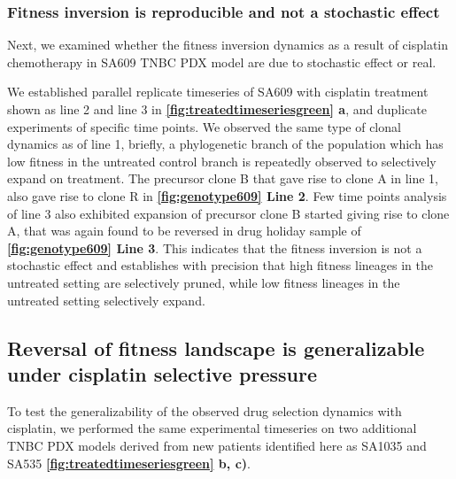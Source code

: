 \subsubsection{Fitness inversion is reproducible and not a stochastic effect}
Next, we examined whether the fitness inversion dynamics as a result of cisplatin chemotherapy in SA609 TNBC PDX model are due to stochastic effect or real.

We established parallel replicate timeseries of SA609 with cisplatin treatment shown as line 2 and line 3 in \textbf{\autoref{fig:treatedtimeseriesgreen} a}, and duplicate experiments of specific time points. We observed the same type of clonal dynamics as of line 1, briefly, a phylogenetic branch of the population which has low fitness in the untreated control branch is repeatedly observed to selectively expand on treatment. The precursor clone B that gave rise to clone A in line 1, also gave rise to clone R in \textbf{\autoref{fig:genotype609} Line 2}. Few time points analysis of line 3 also exhibited expansion of precursor clone B started giving rise to clone A, that was again found to be reversed in drug holiday sample of \textbf{\autoref{fig:genotype609} Line 3}. This indicates that the fitness inversion is not a stochastic effect and establishes with precision that high fitness lineages in the untreated setting are selectively pruned, while low fitness lineages in the untreated setting selectively expand.



\subsection{Reversal of fitness landscape is generalizable under cisplatin selective pressure}
To test the generalizability of the observed drug selection dynamics with cisplatin, we performed the same experimental timeseries on two additional TNBC PDX models derived from new patients identified here as SA1035 and SA535 \textbf{\autoref{fig:treatedtimeseriesgreen}  b, c)}. 

